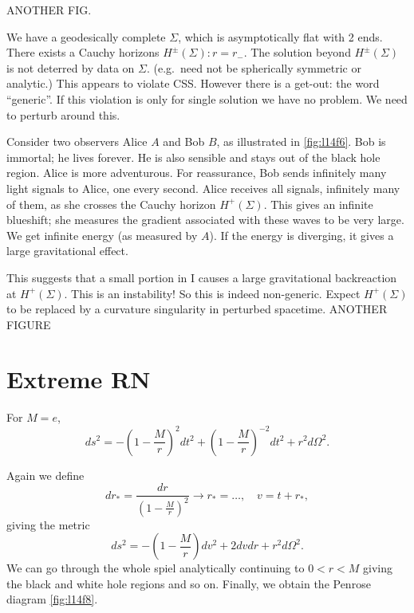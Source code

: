 ANOTHER FIG.

We have a geodesically complete $\Sigma$, which is asymptotically flat with 2 ends.
There exists a Cauchy horizons $H^{\pm}(\Sigma): r = r_-$.
The solution beyond $H^{\pm}(\Sigma)$ is not deterred by data on $\Sigma$.
(e.g.~need not be spherically symmetric or analytic.)
This appears to violate CSS. However there is a get-out: the word ``generic''.
If this violation is only for single solution we have no problem.
We need to perturb around this.

Consider two observers Alice $A$ and Bob $B$, as illustrated in \ref{fig:l14f6}.
Bob is immortal; he lives forever. He is also sensible and stays out of the black hole region. Alice is more adventurous. For reassurance, Bob sends infinitely many light signals to Alice, one every second.
Alice receives all signals, infinitely many of them, as she crosses the Cauchy horizon $H^+(\Sigma)$.
This gives an infinite blueshift; she measures the gradient associated with these waves to be very large.
We get infinite energy (as measured by $A$).
If the energy is diverging, it gives a large gravitational effect. 
\begin{figure}[tbhp]
  \centering
  \def\svgwidth{0.4\columnwidth}
  
  \caption{}
  \label{fig:l14f5}
\end{figure}

This suggests that a small portion in I causes a large gravitational backreaction at $H^+(\Sigma)$. This is an instability! So this is indeed non-generic.
Expect $H^+(\Sigma)$ to be replaced by a curvature singularity in perturbed spacetime.
ANOTHER FIGURE

\section{Extreme RN}%
\label{sec:extreme_rn}

For $M = e$, 
\begin{equation}
  ds^2 = - \left( 1 - \frac{M}{r} \right)^2 dt^2 + \left( 1 - \frac{M}{r} \right)^{-2} dt^2 + r^2 d\Omega^2.
\end{equation}

Again we define
\begin{equation}
  dr_* = \frac{dr}{\left( 1 - \frac{M}{r} \right)^2} \rightarrow r_* = \dots ,\quad v =t + r_*, 
\end{equation}
giving the metric
\begin{equation}
  ds^2 = - \left( 1 - \frac{M}{r} \right) dv^2 + 2 d v d r + r^2 d\Omega^2.
\end{equation}
We can go through the whole spiel analytically continuing to $0 < r < M$ giving the black and white hole regions and so on.
Finally, we obtain the Penrose diagram \ref{fig:l14f8}.

